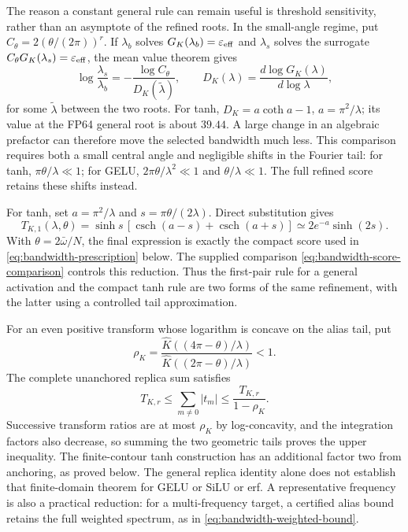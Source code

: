 The reason a constant general rule can remain useful is threshold
sensitivity, rather than an asymptote of the refined roots. In the
small-angle regime, put $C_\theta=2(\theta/(2\pi))^r$. If $\lambda_b$ solves
$G_K(\lambda_b)=\varepsilon_{\rm eff}$ and $\lambda_s$ solves the surrogate
$C_\theta G_K(\lambda_s)=\varepsilon_{\rm eff}$, the mean value theorem gives
\begin{equation}
 \log\frac{\lambda_s}{\lambda_b}
 =-\frac{\log C_\theta}{D_K(\widetilde\lambda)},\qquad
 D_K(\lambda)=\frac{d\log G_K(\lambda)}{d\log\lambda},
 \label{eq:bw-threshold-sensitivity}
\end{equation}
for some $\widetilde\lambda$ between the two roots. For tanh,
$D_K=a\coth a-1$, $a=\pi^2/\lambda$; its value at the FP64 general root is
about $39.44$. A large change in an algebraic prefactor can therefore move
the selected bandwidth much less. This comparison requires both a small
central angle and negligible shifts in the Fourier tail: for tanh,
$\pi\theta/\lambda\ll1$; for GELU, $2\pi\theta/\lambda^2\ll1$ and
$\theta/\lambda\ll1$. The full refined score retains these shifts instead.

For tanh, set $a=\pi^2/\lambda$ and
$s=\pi\theta/(2\lambda)$. Direct substitution gives
\begin{equation}
 T_{K,1}(\lambda,\theta)
 =\sinh s\,[\operatorname{csch}(a-s)+\operatorname{csch}(a+s)]
 \simeq2e^{-a}\sinh(2s).
 \label{eq:bw-tanh-reduction}
\end{equation}
With $\theta=2\bar\omega/N$, the final expression is exactly the compact
score used in \eqref{eq:bandwidth-prescription} below. The supplied
comparison \eqref{eq:bandwidth-score-comparison} controls this reduction.
Thus the first-pair rule for a general activation and the compact tanh rule
are two forms of the same refinement, with the latter using a controlled
tail approximation.

For an even positive transform whose logarithm is concave on the alias
tail, put
\[
 \rho_K=
 \frac{\widehat K((4\pi-\theta)/\lambda)}
      {\widehat K((2\pi-\theta)/\lambda)}<1.
\]
The complete unanchored replica sum satisfies
\begin{equation}
 T_{K,r}\le\sum_{m\ne0}|t_m|
 \le\frac{T_{K,r}}{1-\rho_K}.
 \label{eq:bw-tail-control}
\end{equation}
Successive transform ratios are at most $\rho_K$ by log-concavity, and the
integration factors also decrease, so summing the two geometric tails
proves the upper inequality. The finite-contour tanh construction has an
additional factor two from anchoring, as proved below. The general replica
identity alone does not establish that finite-domain theorem for GELU or
SiLU or erf. A representative frequency is also a practical reduction: for a
multi-frequency target, a certified alias bound retains the full weighted
spectrum, as in \eqref{eq:bandwidth-weighted-bound}.

